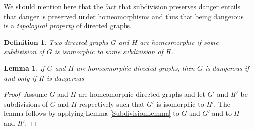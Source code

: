 \documentclass[12pt]{article}
\newtheorem{lem}[thm]{Lemma}
\newtheorem{defn}{Definition}
\theoremstyle{remark}
\begin{document}
We should mention here that the fact that subdivision preserves danger entails that danger is preserved under homeomorphisms and thus that being dangerous is a \textit{topological property} of directed graphs. 


\begin{defn}
Two directed graphs $G$ and $H$ are \emph{homeomorphic} if some subdivision of $G$ is isomorphic to some subdivision of $H$.
\end{defn}

\begin{lem}
If $G$ and $H$ are homeomorphic directed graphs, then $G$ is dangerous if and only if $H$ is dangerous.
\end{lem}
\begin{proof}
Assume $G$ and $H$ are homeomorphic directed graphs and let $G'$ and $H'$ be subdivisions of $G$ and $H$ respectively such that $G'$ is isomorphic to $H'$. The lemma follows by applying Lemma \ref{SubdivisionLemma} to $G$ and $G'$ and to $H$ and $H'$.
\end{proof}
\end{document}

